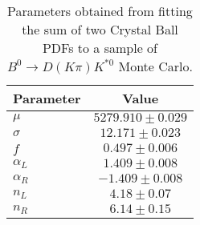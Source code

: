 \begin{table}[h]
  \centering
  \begin{tabular}{lc}
      \toprule
      Parameter & Value \\
      \midrule
      $\mu$ & $5279.910 \pm 0.029$ \\
      $\sigma$ & $12.171 \pm 0.023$ \\
      $f$ & $0.497 \pm 0.006$ \\
      $\alpha_L$ & $1.409 \pm 0.008$ \\
      $\alpha_R$ & $-1.409 \pm 0.008$ \\
      $n_L$ & $4.18 \pm 0.07$ \\
      $n_R$ & $6.14 \pm 0.15$ \\
  \bottomrule
  \end{tabular}
  \caption{Parameters obtained from fitting the sum of two Crystal Ball PDFs to a sample of $B^0 \to D(K\pi)K^{*0}$ Monte Carlo.}
\label{tab:signal_Kpi_MC_params}
\end{table}
